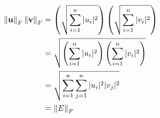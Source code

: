 \begin{enumerate}
\begin{solution}
\begin{align*}\left\lVert\mathbf{u}\right\rVert_F \left\lVert\mathbf{v}\right\rVert_F
    &= \left(\sqrt{\sum_{i=1}^n|u_i|^2}\right)\left(\sqrt{\sum_{i=1}^n|v_i|^2}\right)\\
    &= \sqrt{\left(\sum_{i=1}^n|u_i|^2\right)\left(\sum_{i=1}^n|v_i|^2\right)}\\
    &= \sqrt{\sum_{i=1}^n\sum_{j=1}^n|u_i|^2|v_j|^2}\\
    &= \left\lVert E\right\rVert_F
\end{align*}
\end{solution}
\end{enumerate}
